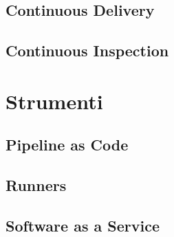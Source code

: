 \subsection{Continuous Delivery}

\subsection{Continuous Inspection}

\section{Strumenti}
\subsection{Pipeline as Code}

\subsection{Runners}

\subsection{Software as a Service}
